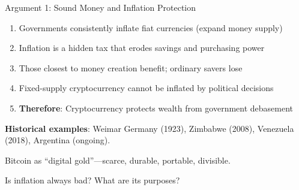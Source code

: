 ﻿\documentclass[aspectratio=169,11pt]{beamer}
\begin{document}
\begin{frame}[shrink=8]{Argument 1: Sound Money and Inflation Protection}
\begin{probox}
\begin{enumerate}
    \item Governments consistently inflate fiat currencies (expand money supply)
    \item Inflation is a hidden tax that erodes savings and purchasing power
    \item Those closest to money creation benefit; ordinary savers lose
    \item Fixed-supply cryptocurrency cannot be inflated by political decisions
    \item \textbf{Therefore}: Cryptocurrency protects wealth from government debasement
\end{enumerate}
\end{probox}

\vspace{0.3em}
\textbf{Historical examples}: Weimar Germany (1923), Zimbabwe (2008), Venezuela (2018), Argentina (ongoing).

Bitcoin as ``digital gold''---scarce, durable, portable, divisible.

\begin{discussionbox}[Discussion]
Is inflation always bad? What are its purposes?
\end{discussionbox}
\end{frame}
\end{document}

